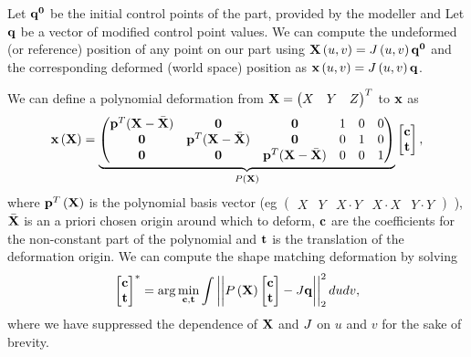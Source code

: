 Let $\mathbf{q^0}$ be the initial control points of the part, provided by the modeller and Let $\mathbf{q}$ be a vector of modified control point values.
We can compute the undeformed (or reference) position of any point on our part using $\mathbf{X}\left(u,v\right) = J\left(u,v\right)\mathbf{q^0}$ and the corresponding
deformed (world space) position as $\mathbf{x}\left(u,v\right) = J\left(u,v\right)\mathbf{q}$.

We can define a polynomial deformation from $\mathbf{X} = \begin{pmatrix} X & Y & Z \end{pmatrix}^T$ to $\mathbf{x}$  as 
\begin{equation}
    \mathbf{x}\left(\mathbf{X}\right) = 
    \underbrace{\begin{pmatrix}
    \mathbf{p}^T(\mathbf{X}-\bar{\mathbf{X}}) & \mathbf{0} & \mathbf{0} & 1 & 0 & 0\\
    \mathbf{0} & \mathbf{p}^T(\mathbf{X}-\bar{\mathbf{X}}) & \mathbf{0} & 0 & 1 & 0\\
    \mathbf{0} & \mathbf{0} & \mathbf{p}^T(\mathbf{X}-\bar{\mathbf{X}}) & 0 & 0 & 1\\
    \end{pmatrix}}_{P\left(\mathbf{X}\right)}
    \begin{bmatrix} \mathbf{c}\\ \mathbf{t} \end{bmatrix},
    \label{eq:projection}
\end{equation} where $\mathbf{p}^T\left(\mathbf{X}\right)$ is the polynomial basis vector \newline (eg $\begin{pmatrix} X & Y & X\cdot Y & X\cdot X & Y\cdot Y \end{pmatrix}$ ),
$\bar{\mathbf{X}}$ is an a priori chosen origin around which to deform, $\mathbf{c}$ are the coefficients for the 
non-constant part of the polynomial and $\mathbf{t}$ is the translation of the deformation origin. 
We can compute the shape matching deformation by solving~\cite{10.1145/1073204.1073216}
\begin{equation}
   \begin{bmatrix} \mathbf{c}\\ \mathbf{t} \end{bmatrix}^* = \arg\min_{\mathbf{c},\mathbf{t}} \int \left\lvert\left\lvert P\left(\mathbf{X}\right)\begin{bmatrix} \mathbf{c}\\ \mathbf{t} \end{bmatrix} - J\mathbf{q}\right\rvert\right\rvert^2_2 dudv,
\end{equation} where we have suppressed the dependence of $\mathbf{X}$ and $J$ on $u$ and $v$ for the sake of brevity.

